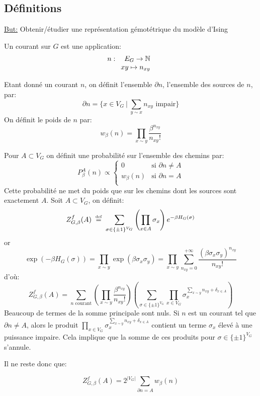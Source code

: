 \documentclass[a4paper,12pt]{report}
\newcommand\eqdef{\mathrel{\stackrel{\makebox[0pt]{\mbox{\normalfont\tiny def}}}{=}}}
\begin{document}
\subsection{Définitions}
\underline{But:} Obtenir/étudier une représentation gémotétrique du modèle d'Ising

\begin{defi}[Courant]
Un courant sur $G$ est une application: 
$$n :\begin{array}[t]{rcl} E_G \rightarrow \mathbb{N} \\ xy \mapsto n_{xy} \end{array}$$
\end{defi}

Etant donné un courant $n$, on définit l'ensemble $\partial n$, l'ensemble des sources de $n$, par:
$$
\partial n = \Big\lbrace x \in V_G \ \vert \ \sum_{y \sim x} n_{xy} \text{ impair} \Big\rbrace
$$
On définit le poids de $n$ par:
$$
w_{\beta}(n) = \prod_{x \sim y} \frac{\beta^{n_{xy}}}{n_{xy}!}
$$

Pour $A \subset V_G$ on définit une probabilité sur l'ensemble des chemins par:
$$
P^A_{\beta}(n) \propto 
\begin{cases}
0 & \text{si } \partial n \neq A \\
w_{\beta}(n) & \text{si } \partial n = A \\
\end{cases}
$$
Cette probabilité ne met du poids que sur les chemins dont les sources sont exactement $A$.
Soit $A \subset V_G$, on définit:
$$
Z_{G,\beta}^f(A) \ \eqdef \ \sum_{\sigma \in \{ \pm 1 \}^{V_G} } \left( \prod_{x \in A} \sigma_x \right) e^{- \beta H_G(\sigma)}
$$
or
$$
\exp(-\beta H_G(\sigma)) = \prod_{x \sim y} \exp(\beta \sigma_x \sigma_y) = \prod_{x \sim y} \sum_{n_{xy}=0}^{+ \infty} \frac{(\beta \sigma_x \sigma_y)^{n_{xy}}}{n_{xy}!}
$$
d'où:
$$
Z_{G,\beta}^f(A) = \sum_{n \text{ courant}} \left( \prod_{x \sim y} \frac{\beta^{n_{xy}}}{n_{xy}!} \right) \left( \sum_{\sigma \in \{ \pm 1 \}^{V_G}} \prod_{x \in V_G} \sigma_x^{\sum_{x \sim y} n_{xy} + \delta_{x \in A}} \right)
$$
Beaucoup de termes de la somme principale sont nuls. Si $n$ est un courant tel que $\partial n \neq A$, alors le produit $\prod_{x \in V_G} \sigma_x^{\sum_{x \sim y} n_{xy} + \delta_{x \in A}}$ contient un terme $\sigma_x$ élevé à une puissance impaire. Cela implique que la somme de ces produits pour $\sigma \in \{ \pm 1 \}^{V_G}$ s'annule.
\newline

Il ne reste donc que:
\begin{prop}
$$
Z_{G,\beta}^f(A) = 2^{\vert V_G \vert} \sum_{\partial n  = A} w_{\beta}(n)
$$
\end{prop}
\end{document}
